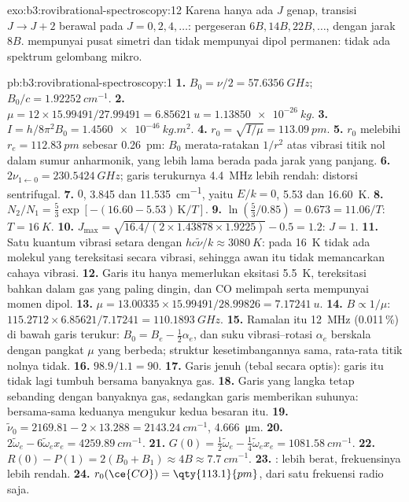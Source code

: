 \begin{solution}{exo:b3:rovibrational-spectroscopy:12}
Karena hanya ada $J$ genap, transisi $J \to J + 2$ berawal pada $J = 0, 2, 4, \dots$:
pergeseran $6B, 14B, 22B, \dots$, dengan jarak $8B$.  mempunyai pusat
simetri dan tidak mempunyai dipol permanen: tidak ada spektrum gelombang mikro.
\end{solution}

\begin{solution}{pb:b3:rovibrational-spectroscopy:1}
\textbf{1.} $B_0 = \nu/2 = \qty{57.6356}{GHz}$; $B_0/c = \qty{1.92252}{cm^{-1}}$.
\textbf{2.} $\mu = 12 \times 15.99491/27.99491 = \qty{6.85621}{u} = \qty{1.13850e-26}{kg}$.
\textbf{3.} $I = h/8\pi^2B_0 = \qty{1.4560e-46}{kg.m^2}$.
\textbf{4.} $r_0 = \sqrt{I/\mu} = \qty{113.09}{pm}$.
\textbf{5.} $r_0$ melebihi $r_e = \qty{112.83}{pm}$ sebesar \qty{0.26}{pm}: $B_0$
merata-ratakan $1/r^2$ atas vibrasi titik nol dalam sumur anharmonik, yang
lebih lama berada pada jarak yang panjang.
\textbf{6.} $2\nu_{1\leftarrow0} = \qty{230.5424}{GHz}$; garis terukurnya
\qty{4.4}{MHz} lebih rendah: distorsi sentrifugal.
\textbf{7.} $0$, 3.845 dan \qty{11.535}{cm^{-1}}, yaitu $E/k = 0$, 5.53 dan
\qty{16.60}{K}.
\textbf{8.} $N_2/N_1 = \frac53\exp[-(16.60 - 5.53)\,\mathrm K/T]$.
\textbf{9.} $\ln(\frac53/0.85) = 0.673 = 11.06/T$: $T = \qty{16}{K}$.
\textbf{10.} $J_{\max} = \sqrt{16.4/(2 \times 1.43878 \times 1.9225)} - 0.5 = 1.2$: $J = 1$.
\textbf{11.} Satu kuantum vibrasi setara dengan $hc\tilde\nu/k \approx \qty{3080}{K}$:
pada \qty{16}{K} tidak ada molekul yang tereksitasi secara vibrasi, sehingga
awan itu tidak memancarkan cahaya vibrasi.
\textbf{12.} Garis itu hanya memerlukan eksitasi \qty{5.5}{K}, tereksitasi
bahkan dalam gas yang paling dingin, dan CO melimpah serta mempunyai momen
dipol.
\textbf{13.} $\mu = 13.00335 \times 15.99491/28.99826 = \qty{7.17241}{u}$.
\textbf{14.} $B \propto 1/\mu$: $115.2712 \times 6.85621/7.17241 = \qty{110.1893}{GHz}$.
\textbf{15.} Ramalan itu \qty{12}{MHz} (0.011\,\%) di bawah garis terukur:
$B_0 = B_e - \frac12\alpha_e$, dan suku vibrasi--rotasi $\alpha_e$ berskala dengan
pangkat $\mu$ yang berbeda; struktur kesetimbangannya sama, rata-rata titik
nolnya tidak.
\textbf{16.} $98.9/1.1 = 90$.
\textbf{17.} Garis  jenuh (tebal secara optis): garis itu tidak
lagi tumbuh bersama banyaknya gas.
\textbf{18.} Garis  yang langka tetap sebanding dengan banyaknya
gas, sedangkan garis  memberikan suhunya: bersama-sama keduanya
mengukur kedua besaran itu.
\textbf{19.} $\tilde\nu_0 = 2169.81 - 2 \times 13.288 = \qty{2143.24}{cm^{-1}}$,
\qty{4.666}{\micro m}.
\textbf{20.} $2\tilde\omega_e - 6\tilde\omega_ex_e = \qty{4259.89}{cm^{-1}}$.
\textbf{21.} $G(0) = \frac12\tilde\omega_e - \frac14\tilde\omega_ex_e = \qty{1081.58}{cm^{-1}}$.
\textbf{22.} $R(0) - P(1) = 2(B_0 + B_1) \approx 4B \approx \qty{7.7}{cm^{-1}}$.
\textbf{23.} :  lebih berat, frekuensinya
lebih rendah.
\textbf{24.} \textbf{$r_0(\ce{CO}) = \qty{113.1}{pm}$}, dari satu frekuensi radio
saja.
\end{solution}

